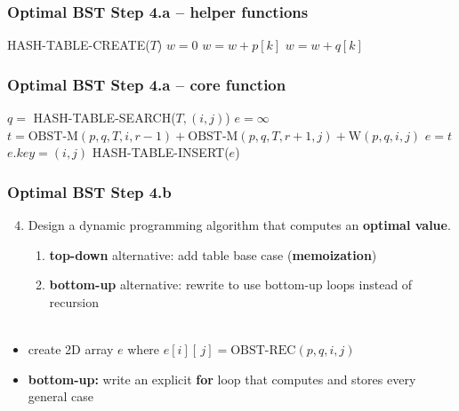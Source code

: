 \documentclass[10pt,aspectratio=169]{beamer}
\newcommand{\stanza}{ \\~\ }
\begin{document}
\begin{frame} \frametitle{Optimal BST Step 4.a -- helper functions}
  {\scriptsize
  \begin{algorithmic}[1]
      \State HASH-TABLE-CREATE($T$)
      \State {}
    \EndFunction
      \State $w = 0$
        \State $w = w + p[k]$
      \EndFor
        \State $w = w + q[k]$
      \EndFor
      \State {}
    \EndFunction
  \end{algorithmic}
  }
\end{frame}

\begin{frame} \frametitle{Optimal BST Step 4.a -- core function}
  {\scriptsize
  \begin{algorithmic}[1]
    \State $q = $ HASH-TABLE-SEARCH($T, (i, j)$)
      \State {}
    \EndIf
      \State {}
    \EndIf
    \State $e = \infty$
      \State $t = \text{OBST-M}(p, q, T, i, r-1) + \text{OBST-M}(p, q, T, r+1, j) + \text{W}(p, q, i, j)$
        \State $e = t$
      \EndIf
    \EndFor
    \State $e.key = (i, j)$
    \State HASH-TABLE-INSERT($e$)
    \State {}
    \EndFunction
  \end{algorithmic}
  }
\end{frame}

\begin{frame} \frametitle{Optimal BST Step 4.b}
  \begin{enumerate}
    \setcounter{enumi}{3}
    \item Design a dynamic programming algorithm that computes an \textbf{optimal value}.
    \begin{enumerate}
      \item \textbf{top-down} alternative: add table base case (\textbf{memoization})
      \item \textbf{bottom-up} alternative: rewrite to use bottom-up loops instead of recursion
      \stanza
    \end{enumerate}
  \end{enumerate}
  \begin{itemize}
    \item create 2D array $e$ where $e[i][\, j] = \text{OBST-REC}(p, q, i, j)$
    \item \textbf{bottom-up:} write an explicit \textbf{for} loop that computes and stores every general case
  \end{itemize}
  \end{frame}
    
\end{document}
